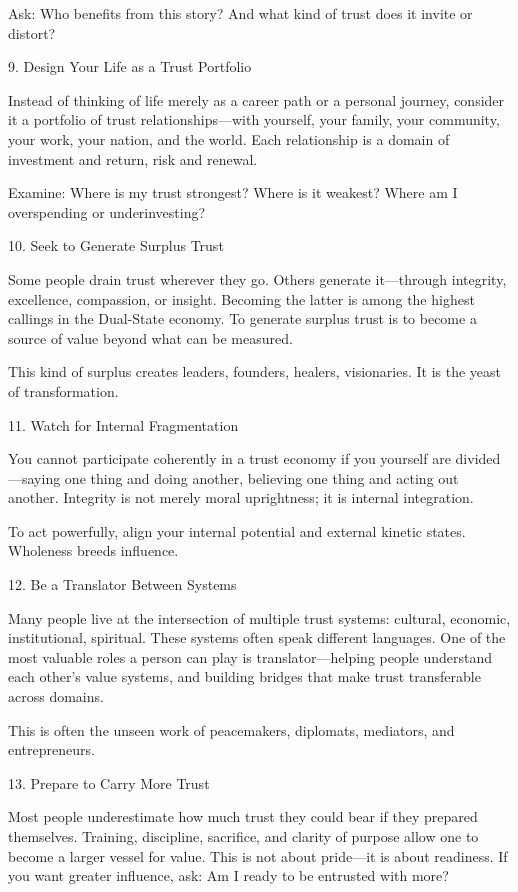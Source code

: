 \documentclass[11pt,oneside]{book}
\begin{document}
Ask: Who benefits from this story? And what kind of trust does it invite or distort?

9. Design Your Life as a Trust Portfolio


Instead of thinking of life merely as a career path or a personal journey, consider it a portfolio of trust relationships—with yourself, your family, your community, your work, your nation, and the world. Each relationship is a domain of investment and return, risk and renewal.

Examine: Where is my trust strongest? Where is it weakest? Where am I overspending or underinvesting?

10. Seek to Generate Surplus Trust


Some people drain trust wherever they go. Others generate it—through integrity, excellence, compassion, or insight. Becoming the latter is among the highest callings in the Dual-State economy. To generate surplus trust is to become a source of value beyond what can be measured.

This kind of surplus creates leaders, founders, healers, visionaries. It is the yeast of transformation.

11. Watch for Internal Fragmentation


You cannot participate coherently in a trust economy if you yourself are divided—saying one thing and doing another, believing one thing and acting out another. Integrity is not merely moral uprightness; it is internal integration.

To act powerfully, align your internal potential and external kinetic states. Wholeness breeds influence.

12. Be a Translator Between Systems


Many people live at the intersection of multiple trust systems: cultural, economic, institutional, spiritual. These systems often speak different languages. One of the most valuable roles a person can play is translator—helping people understand each other’s value systems, and building bridges that make trust transferable across domains.

This is often the unseen work of peacemakers, diplomats, mediators, and entrepreneurs.

13. Prepare to Carry More Trust


Most people underestimate how much trust they could bear if they prepared themselves. Training, discipline, sacrifice, and clarity of purpose allow one to become a larger vessel for value. This is not about pride—it is about readiness. If you want greater influence, ask: Am I ready to be entrusted with more?
\end{document}
